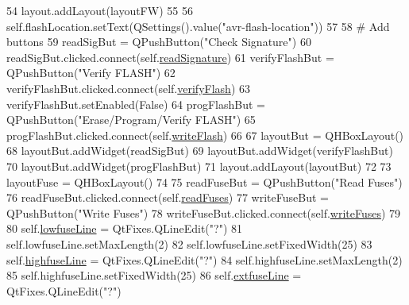 \begin{DoxyCode}
54         layout.addLayout(layoutFW)
55 
56         self.flashLocation.setText(QSettings().value(\textcolor{stringliteral}{"avr-flash-location"}))
57 
58         \textcolor{comment}{# Add buttons}
59         readSigBut = QPushButton(\textcolor{stringliteral}{"Check Signature"})
60         readSigBut.clicked.connect(self.\hyperlink{classsoftware_1_1chipwhisperer_1_1capture_1_1utils_1_1AVRProgrammer_1_1AVRProgrammerDialog_a11c0e89fab704a4a55dda4d5044ca904}{readSignature})
61         verifyFlashBut = QPushButton(\textcolor{stringliteral}{"Verify FLASH"})
62         verifyFlashBut.clicked.connect(self.\hyperlink{classsoftware_1_1chipwhisperer_1_1capture_1_1utils_1_1AVRProgrammer_1_1AVRProgrammerDialog_ac44c91ef718b5f1841eb5ddd436e2f47}{verifyFlash})
63         verifyFlashBut.setEnabled(\textcolor{keyword}{False})
64         progFlashBut = QPushButton(\textcolor{stringliteral}{"Erase/Program/Verify FLASH"})
65         progFlashBut.clicked.connect(self.\hyperlink{classsoftware_1_1chipwhisperer_1_1capture_1_1utils_1_1AVRProgrammer_1_1AVRProgrammerDialog_a3087c0497e148b698db83694ddf3651c}{writeFlash})
66 
67         layoutBut = QHBoxLayout()
68         layoutBut.addWidget(readSigBut)
69         layoutBut.addWidget(verifyFlashBut)
70         layoutBut.addWidget(progFlashBut)
71         layout.addLayout(layoutBut)
72 
73         layoutFuse = QHBoxLayout()
74 
75         readFuseBut = QPushButton(\textcolor{stringliteral}{"Read Fuses"})
76         readFuseBut.clicked.connect(self.\hyperlink{classsoftware_1_1chipwhisperer_1_1capture_1_1utils_1_1AVRProgrammer_1_1AVRProgrammerDialog_a8abfb6eb07a499e177964da8765b7ba4}{readFuses})
77         writeFuseBut = QPushButton(\textcolor{stringliteral}{"Write Fuses"})
78         writeFuseBut.clicked.connect(self.\hyperlink{classsoftware_1_1chipwhisperer_1_1capture_1_1utils_1_1AVRProgrammer_1_1AVRProgrammerDialog_aa93740973dbf489a94084037117799f6}{writeFuses})
79 
80         self.\hyperlink{classsoftware_1_1chipwhisperer_1_1capture_1_1utils_1_1AVRProgrammer_1_1AVRProgrammerDialog_a83ff125ead745344951f8b53b6cc961e}{lowfuseLine} = QtFixes.QLineEdit(\textcolor{stringliteral}{"?"})
81         self.lowfuseLine.setMaxLength(2)
82         self.lowfuseLine.setFixedWidth(25)
83         self.\hyperlink{classsoftware_1_1chipwhisperer_1_1capture_1_1utils_1_1AVRProgrammer_1_1AVRProgrammerDialog_ac41e4bb39408a2a7014e7c0c4259c0ea}{highfuseLine} = QtFixes.QLineEdit(\textcolor{stringliteral}{"?"})
84         self.highfuseLine.setMaxLength(2)
85         self.highfuseLine.setFixedWidth(25)
86         self.\hyperlink{classsoftware_1_1chipwhisperer_1_1capture_1_1utils_1_1AVRProgrammer_1_1AVRProgrammerDialog_a090c304a7af544fc88197fa550f2f09a}{extfuseLine} = QtFixes.QLineEdit(\textcolor{stringliteral}{"?"})

\end{DoxyCode}
